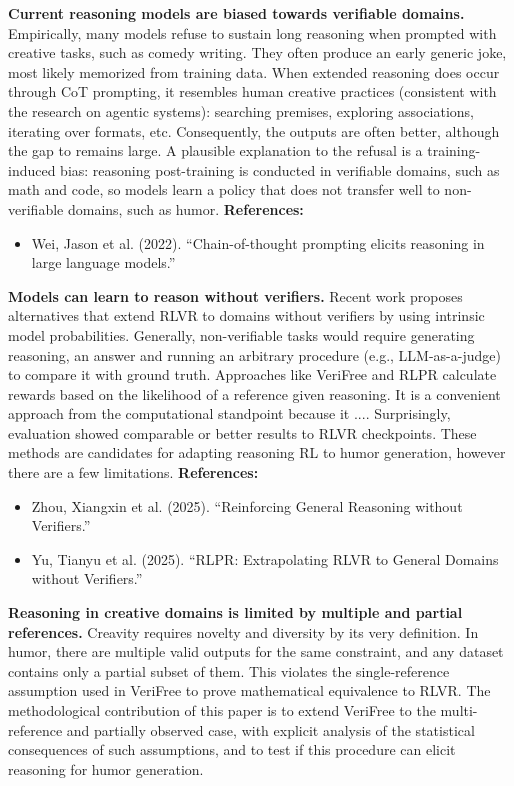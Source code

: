 \documentclass[12pt]{extarticle}
\begin{document}
\textbf{Current reasoning models are biased towards verifiable domains.} Empirically, many models refuse to sustain long reasoning when prompted with creative tasks, such as comedy writing. They often produce an early generic joke, most likely memorized from training data. When extended reasoning does occur through CoT prompting, it resembles human creative practices (consistent with the research on agentic systems): searching premises, exploring associations, iterating over formats, etc. Consequently, the outputs are often better, although the gap to remains large. A plausible explanation to the refusal is a training-induced bias: reasoning post-training is conducted in verifiable domains, such as math and code, so models learn a policy that does not transfer well to non-verifiable domains, such as humor.
\textbf{References:}
\begin{itemize}[leftmargin=1.5em]
  \item Wei, Jason et al. (2022). ``Chain-of-thought prompting elicits reasoning in large language models.''
\end{itemize}

\textbf{Models can learn to reason without verifiers.} Recent work proposes alternatives that extend RLVR to domains without verifiers by using intrinsic model probabilities. Generally, non-verifiable tasks would require generating reasoning, an answer and running an arbitrary procedure (e.g., LLM-as-a-judge) to compare it with ground truth. Approaches like VeriFree and RLPR calculate rewards based on the likelihood of a reference  given reasoning. It is a convenient approach from the computational standpoint because it .... Surprisingly, evaluation showed comparable or better results to RLVR checkpoints. These methods are candidates for adapting reasoning RL to humor generation, however there are a few limitations.
\textbf{References:}
\begin{itemize}[leftmargin=1.5em]
  \item Zhou, Xiangxin et al. (2025). ``Reinforcing General Reasoning without Verifiers.''
  \item Yu, Tianyu et al. (2025). ``RLPR: Extrapolating RLVR to General Domains without Verifiers.''
\end{itemize}

\textbf{Reasoning in creative domains is limited by multiple and partial references.} Creavity requires novelty and diversity by its very definition. In humor, there are multiple valid outputs for the same constraint, and any dataset contains only a partial subset of them. This violates the single-reference assumption used in VeriFree to prove mathematical equivalence to RLVR. The methodological contribution of this paper is to extend VeriFree to the multi-reference and partially observed case, with explicit analysis of the statistical consequences of such assumptions, and to test if this procedure can elicit reasoning for humor generation.
\end{document}
